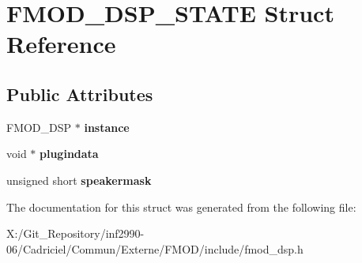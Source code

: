 \hypertarget{struct_f_m_o_d___d_s_p___s_t_a_t_e}{\section{F\-M\-O\-D\-\_\-\-D\-S\-P\-\_\-\-S\-T\-A\-T\-E Struct Reference}
\label{struct_f_m_o_d___d_s_p___s_t_a_t_e}
}
\subsection*{Public Attributes}
\begin{DoxyCompactItemize}
\item 
\hypertarget{struct_f_m_o_d___d_s_p___s_t_a_t_e_a1756ea7b18fdd566e64c64de4151a39c}{F\-M\-O\-D\-\_\-\-D\-S\-P $\ast$ {\bfseries instance}}\label{struct_f_m_o_d___d_s_p___s_t_a_t_e_a1756ea7b18fdd566e64c64de4151a39c}

\item 
\hypertarget{struct_f_m_o_d___d_s_p___s_t_a_t_e_a94293193f1fd65ffc7d72de31e03932c}{void $\ast$ {\bfseries plugindata}}\label{struct_f_m_o_d___d_s_p___s_t_a_t_e_a94293193f1fd65ffc7d72de31e03932c}

\item 
\hypertarget{struct_f_m_o_d___d_s_p___s_t_a_t_e_a98c7cf116176d358e3d26193245f6e19}{unsigned short {\bfseries speakermask}}\label{struct_f_m_o_d___d_s_p___s_t_a_t_e_a98c7cf116176d358e3d26193245f6e19}

\end{DoxyCompactItemize}


The documentation for this struct was generated from the following file\-:\begin{DoxyCompactItemize}
\item 
X\-:/\-Git\-\_\-\-Repository/inf2990-\/06/\-Cadriciel/\-Commun/\-Externe/\-F\-M\-O\-D/include/fmod\-\_\-dsp.\-h\end{DoxyCompactItemize}
